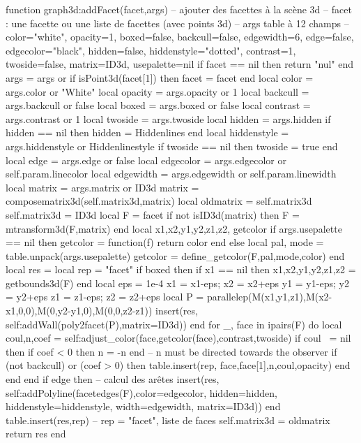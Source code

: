 \documentclass[12pt]{standalone}
\begin{document}
\begin{luacode*}
function graph3d:addFacet(facet,args)
-- ajouter des facettes à la scène 3d
-- facet : une facette ou une liste de facettes (avec points 3d)
-- args table à 12 champs
-- {color="white", opacity=1, boxed=false, backcull=false, edgewidth=6, edge=false, edgecolor="black", hidden=false, hiddenstyle="dotted", contrast=1, twoside=false, matrix=ID3d, usepalette=nil}
    if facet == nil then return {{"nul"}} end
    args = args or {}
    if isPoint3d(facet[1]) then facet = {facet} end
    local color = args.color or "White"
    local opacity = args.opacity or 1
    local backcull = args.backcull or false
    local boxed = args.boxed or false
    local contrast = args.contrast or 1
    local twoside = args.twoside
    local hidden = args.hidden
    if hidden == nil then hidden = Hiddenlines end
    local hiddenstyle = args.hiddenstyle or Hiddenlinestyle
    if twoside == nil then twoside = true end
    local edge = args.edge or false
    local edgecolor = args.edgecolor or self.param.linecolor
    local edgewidth = args.edgewidth or self.param.linewidth
    local matrix = args.matrix or ID3d
    matrix = composematrix3d(self.matrix3d,matrix)
    local oldmatrix = self.matrix3d
    self.matrix3d = ID3d
    local F = facet
    if not isID3d(matrix) then 
        F = mtransform3d(F,matrix)
    end
    local x1,x2,y1,y2,z1,z2, getcolor 
    if args.usepalette == nil then
        getcolor = function(f)
            return color
        end
    else
        local pal, mode = table.unpack(args.usepalette)
        getcolor = define_getcolor(F,pal,mode,color)
    end    
    local res = {}
    local rep = {"facet"}
    if boxed then 
        if x1 == nil then x1,x2,y1,y2,z1,z2 = getbounds3d(F) end
        local eps = 1e-4
        x1 = x1-eps; x2 = x2+eps
        y1 = y1-eps; y2 = y2+eps
        z1 = z1-eps; z2 = z2+eps
        local P = parallelep(M(x1,y1,z1),M(x2-x1,0,0),M(0,y2-y1,0),M(0,0,z2-z1))
        insert(res, self:addWall(poly2facet(P),{matrix=ID3d}))
    end
    for _, face in ipairs(F) do
        local coul,n,coef = self:adjust_color(face,getcolor(face),contrast,twoside)
        if coul ~= nil then
            if coef < 0 then n = -n  end -- n must be directed towards the observer
            if (not backcull) or (coef > 0)  then            
                table.insert(rep, {face,{face[1],n},coul,opacity})
            end
        end
    end
    if edge then
        -- calcul des arêtes
        insert(res, self:addPolyline(facetedges(F),{color=edgecolor, hidden=hidden, hiddenstyle=hiddenstyle, width=edgewidth, matrix=ID3d}))
    end
    table.insert(res,rep) -- rep = {"facet", liste de faces}
    self.matrix3d = oldmatrix
    return res 
end
\end{luacode*}
\end{document}
